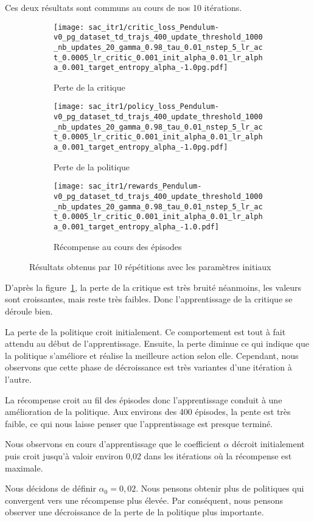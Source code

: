 Ces deux résultats sont communs au cours de nos 10 itérations.

\begin{figure}[H]
    \centering
    \begin{subfigure}{0.30\textwidth}
        \texttt{[image: sac\_itr1/critic\_loss\_Pendulum-v0\_pg\_dataset\_td\_trajs\_400\_update\_threshold\_1000\_nb\_updates\_20\_gamma\_0.98\_tau\_0.01\_nstep\_5\_lr\_act\_0.0005\_lr\_critic\_0.001\_init\_alpha\_0.01\_lr\_alpha\_0.001\_target\_entropy\_alpha\_-1.0pg.pdf]}
        \caption{Perte de la critique}
    \end{subfigure}
    \begin{subfigure}{0.30\textwidth}
        \texttt{[image: sac\_itr1/policy\_loss\_Pendulum-v0\_pg\_dataset\_td\_trajs\_400\_update\_threshold\_1000\_nb\_updates\_20\_gamma\_0.98\_tau\_0.01\_nstep\_5\_lr\_act\_0.0005\_lr\_critic\_0.001\_init\_alpha\_0.01\_lr\_alpha\_0.001\_target\_entropy\_alpha\_-1.0pg.pdf]}
        \caption{Perte de la politique}
    \end{subfigure}
    \begin{subfigure}{0.30\textwidth}
        \texttt{[image: sac\_itr1/rewards\_Pendulum-v0\_pg\_dataset\_td\_trajs\_400\_update\_threshold\_1000\_nb\_updates\_20\_gamma\_0.98\_tau\_0.01\_nstep\_5\_lr\_act\_0.0005\_lr\_critic\_0.001\_init\_alpha\_0.01\_lr\_alpha\_0.001\_target\_entropy\_alpha\_-1.0.pdf]}
        \caption{Récompense au cours des épisodes}
    \end{subfigure}
    \caption{Résultats obtenus par 10 répétitions avec les paramètres initiaux}\label{fig:sac:results}
\end{figure}

D'après la figure~\ref{fig:sac:results}, la perte de la critique est très bruité
néanmoins, les valeurs sont croissantes, mais reste très faibles. Donc
l'apprentissage de la critique se déroule bien.

La perte de la politique croit initialement. Ce comportement est tout à fait
attendu au début de l'apprentissage. Ensuite, la perte diminue ce qui indique
que la politique s'améliore et réalise la meilleure action selon elle.
Cependant, nous observons que cette phase de décroissance est très variantes
d'une itération à l'autre.

La récompense croit au fil des épisodes donc l'apprentissage conduit à une
amélioration de la politique. Aux environs des 400 épisodes, la pente est très
faible, ce qui nous laisse penser que l'apprentissage est presque terminé.

Nous observons en cours d'apprentissage que le coefficient \(\alpha\) décroit
initialement puis croit jusqu'à valoir environ 0,02 dans les itérations où la
récompense est maximale.

Nous décidons de définir \(\alpha_{0}=0,02\). Nous pensons obtenir plus de
politiques qui convergent vers une récompense plus élevée. Par conséquent, nous
pensons observer une décroissance de la perte de la politique plus importante.
